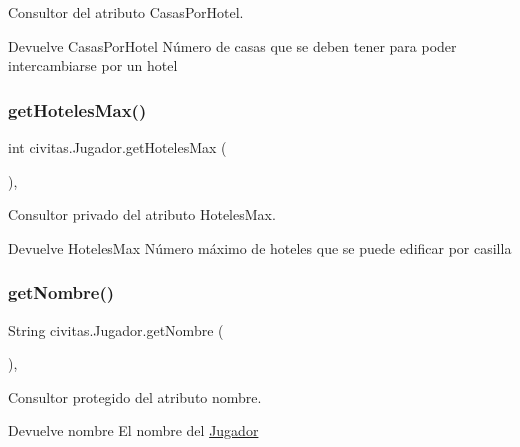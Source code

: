 Consultor del atributo Casas\+Por\+Hotel. \begin{DoxyReturn}{Devuelve}
Casas\+Por\+Hotel Número de casas que se deben tener para poder intercambiarse por un hotel 
\end{DoxyReturn}
\mbox{\label{classcivitas_1_1Jugador_adcb057e3337f0c727184071a8b8374f8}} 
\subsubsection{\texorpdfstring{get\+Hoteles\+Max()}{getHotelesMax()}}
{\footnotesize\ttfamily int civitas.\+Jugador.\+get\+Hoteles\+Max (\begin{DoxyParamCaption}{ }\end{DoxyParamCaption})\hspace{0.3cm}{\ttfamily [inline]}, {\ttfamily [private]}}

Consultor privado del atributo Hoteles\+Max. \begin{DoxyReturn}{Devuelve}
Hoteles\+Max Número máximo de hoteles que se puede edificar por casilla 
\end{DoxyReturn}
\mbox{\label{classcivitas_1_1Jugador_a798c1fffaaf1dd8d12f36dd3d09b4f1b}} 
\subsubsection{\texorpdfstring{get\+Nombre()}{getNombre()}}
{\footnotesize\ttfamily String civitas.\+Jugador.\+get\+Nombre (\begin{DoxyParamCaption}{ }\end{DoxyParamCaption})\hspace{0.3cm}{\ttfamily [inline]}, {\ttfamily [protected]}}

Consultor protegido del atributo nombre. \begin{DoxyReturn}{Devuelve}
nombre El nombre del \hyperlink{classcivitas_1_1Jugador}{Jugador} 
\end{DoxyReturn}
\mbox{\label{classcivitas_1_1Jugador_ae60e7e2b72553535a3100e11a89e6948}} 

